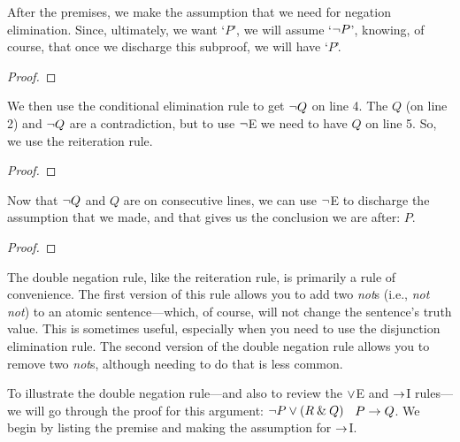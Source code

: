 After the premises, we make the assumption that we need for negation elimination. Since, ultimately, we want `$P$', we will assume `${\neg} P$', knowing, of course, that once we discharge this subproof, we will have `$P$'.

\begin{proof}
	 	
	 
	\open
\end{proof}
We then use the conditional elimination rule to get ${\neg} Q$ on line 4. The $Q$ (on line 2) and ${\neg} Q$ are a contradiction, but to use ${\neg}$E we need to have $Q$ on line 5. So, we use the reiteration rule. 

\begin{proof}
	 	
	 
	\open
\end{proof}
Now that ${\neg} Q$ and $Q$ are on consecutive lines, we can use ${\neg}$E to discharge the assumption that we made, and that gives us the conclusion we are after: $P$.

\begin{proof}
	 	
	 
	\open
	\close
\end{proof}

The double negation rule, like the reiteration rule, is primarily a rule of convenience. The first version of this rule allows you to add two \textit{not}s (i.e., \textit{not not}) to an atomic sentence---which, of course, will not change the sentence's truth value. This is sometimes useful, especially when you need to use the disjunction elimination rule. The second version of the double negation rule allows you to remove two \textit{not}s, although needing to do that is less common.


To illustrate the double negation rule---and also to review the $\vee$E and $\rightarrow$I rules---we will go through the proof for this argument: ${\neg} P \vee (R \mathbin{\&} Q)$ \therefore\ $P \rightarrow Q$. We begin by listing the premise and making the assumption for $\rightarrow$I.

